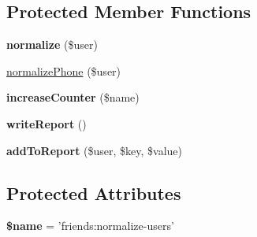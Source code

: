 \subsection*{Protected Member Functions}
\begin{DoxyCompactItemize}
\item 
\hypertarget{classDMA_1_1Friends_1_1Commands_1_1NormalizeUserData_a1078b99623707b6392b0d791f8729cb8}{{\bfseries normalize} (\$user)}\label{classDMA_1_1Friends_1_1Commands_1_1NormalizeUserData_a1078b99623707b6392b0d791f8729cb8}

\item 
\hyperlink{classDMA_1_1Friends_1_1Commands_1_1NormalizeUserData_a19288b02592b7e02e667651f3de20d2a}{normalize\+Phone} (\$user)
\item 
\hypertarget{classDMA_1_1Friends_1_1Commands_1_1NormalizeUserData_a461a7984a9cd1ab0f7c5bc6be0edf90c}{{\bfseries increase\+Counter} (\$name)}\label{classDMA_1_1Friends_1_1Commands_1_1NormalizeUserData_a461a7984a9cd1ab0f7c5bc6be0edf90c}

\item 
\hypertarget{classDMA_1_1Friends_1_1Commands_1_1NormalizeUserData_a4c66677355e7e5f797dd7bc296c46584}{{\bfseries write\+Report} ()}\label{classDMA_1_1Friends_1_1Commands_1_1NormalizeUserData_a4c66677355e7e5f797dd7bc296c46584}

\item 
\hypertarget{classDMA_1_1Friends_1_1Commands_1_1NormalizeUserData_a9c10e6d3ea1320d5aef15ddba36b325f}{{\bfseries add\+To\+Report} (\$user, \$key, \$value)}\label{classDMA_1_1Friends_1_1Commands_1_1NormalizeUserData_a9c10e6d3ea1320d5aef15ddba36b325f}

\end{DoxyCompactItemize}
\subsection*{Protected Attributes}
\begin{DoxyCompactItemize}
\item 
\hypertarget{classDMA_1_1Friends_1_1Commands_1_1NormalizeUserData_ad3564233e0bfca05feada7e6ff525aca}{{\bfseries \$name} = 'friends\+:normalize-\/users'}\label{classDMA_1_1Friends_1_1Commands_1_1NormalizeUserData_ad3564233e0bfca05feada7e6ff525aca}

\end{DoxyCompactItemize}


